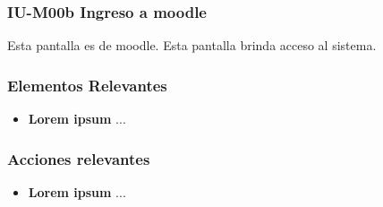
\subsubsection{IU-M00b Ingreso a moodle}

    Esta pantalla es de moodle. Esta pantalla brinda acceso al sistema.


\subsubsection{Elementos Relevantes}

    \begin{itemize}
    \item {\bf Lorem ipsum}
        ...
    \end{itemize}

\subsubsection{Acciones relevantes}

    \begin{itemize}
    \item {\bf Lorem ipsum}
        ...
    \end{itemize}

\clearpage
